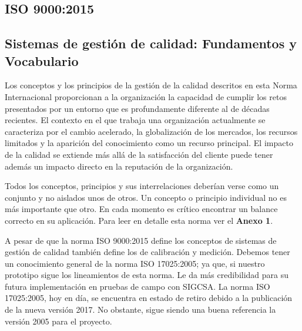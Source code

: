 \subsection{ISO 9000:2015}
\subsection*{Sistemas de gestión de calidad: Fundamentos y Vocabulario}

\par 
Los conceptos y los principios de la gestión de la calidad descritos en esta Norma Internacional proporcionan a la organización la capacidad de cumplir los retos presentados por un entorno que es profundamente diferente al de décadas recientes. El contexto en el que trabaja una organización actualmente se caracteriza por el cambio acelerado, la globalización de los mercados, los recursos limitados y la aparición del conocimiento como un recurso principal. El impacto de la calidad se extiende más allá de la satisfacción del cliente puede tener además un impacto directo en la reputación de la organización.\cite{iso9000}

\par \noindent 
Todos los conceptos, principios y sus interrelaciones deberían verse como un conjunto y no aislados unos de otros. Un concepto o principio individual no es más importante que otro. En cada momento es crítico encontrar un balance correcto en su aplicación. Para leer en detalle esta norma ver el \textbf{Anexo 1}.

\par \noindent
A pesar de que la norma ISO 9000:2015 define los conceptos de sistemas de gestión de calidad también define los de calibración y medición. Debemos tener un conocimiento general de la norma ISO 17025:2005; ya que, si nuestro prototipo sigue los lineamientos de esta norma. Le da más credibilidad para su futura implementación en pruebas de campo con SIGCSA. La norma ISO 17025:2005, hoy en día, se encuentra en estado de retiro debido a la publicación de la nueva versión 2017. No obstante, sigue siendo una buena referencia la versión 2005 para el proyecto.\cite{iso9000}
